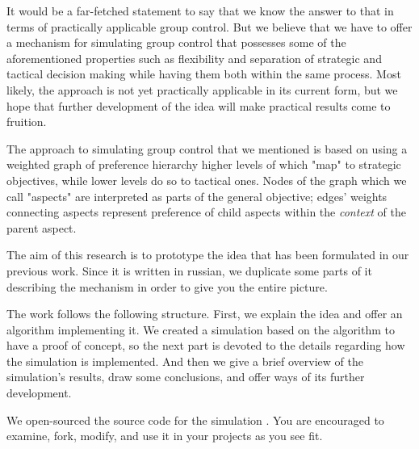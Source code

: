 It would be a far-fetched statement to say that we know the answer to that in terms of practically applicable group
control. But we believe that we have to offer a mechanism for simulating group control that possesses some of the
aforementioned properties such as flexibility and separation of strategic and tactical decision making while having them
both within the same process. Most likely, the approach is not yet practically applicable in its current form, but we
hope that further development of the idea will make practical results come to fruition.

The approach to simulating group control that we mentioned is based on using a weighted graph of preference hierarchy
higher levels of which "map" to strategic objectives, while lower levels do so to tactical ones. Nodes of the graph
which we call "aspects" are interpreted as parts of the general objective; edges' weights connecting aspects represent
preference of child aspects within the \textit{context} of the parent aspect.


The aim of this research is to prototype the idea that has been formulated in our previous work.
Since it is written in
russian, we duplicate some parts of it describing the mechanism in order to give you the entire picture.

The work follows the following structure. First, we explain the idea and offer an algorithm implementing it. We created
a simulation based on the algorithm to have a proof of concept, so the next part is devoted to the details regarding how
the simulation is implemented. And then we give a brief overview of the simulation's results, draw some conclusions, and
offer ways of its further development.

We open-sourced the source code for the simulation \cite{github}. You are encouraged to examine, fork, modify, and use
it in your projects as you see fit.
